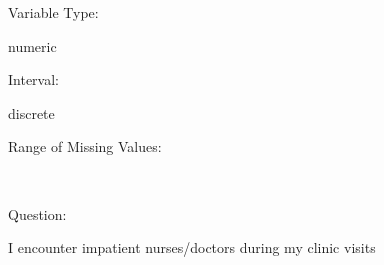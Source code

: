 \documentclass[
]{article}
\begin{document}
\begin{minipage}[t]{0.3\linewidth}

Variable Type:

\end{minipage}%
\begin{minipage}[t]{0.7\linewidth}

numeric

\end{minipage}

\begin{minipage}[t]{0.3\linewidth}

Interval:

\end{minipage}%
\begin{minipage}[t]{0.7\linewidth}

discrete

\end{minipage}

\begin{minipage}[t]{0.3\linewidth}

Range of Missing Values:

\end{minipage}%
\begin{minipage}[t]{0.7\linewidth}

~

\end{minipage}

\begin{minipage}[t]{0.3\linewidth}

Question:

\end{minipage}%
\begin{minipage}[t]{0.7\linewidth}

I encounter impatient nurses/doctors during my clinic visits

\end{minipage}
\end{document}
